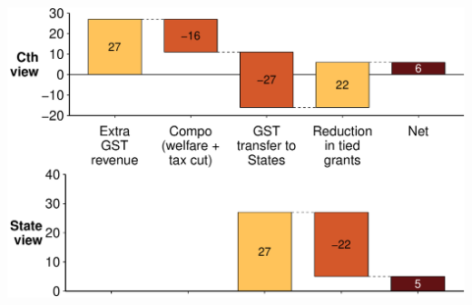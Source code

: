 \documentclass[a4paper,landscape]{article}\usepackage[]{graphicx}\usepackage[]{color}
\newenvironment{knitrout}{}{} %
\begin{document}
\begin{knitrout}
\includegraphics[width=11.000in,height=7.00in]{figure/GST-Figure-11-3} 

\end{knitrout}
\end{document}
